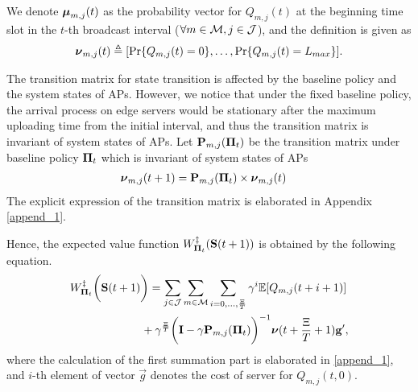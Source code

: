 \begin{lemma}
    We denote $\boldsymbol{\mu}_{m,j}(t)$ as the probability vector for $Q_{m,j}(t)$ at the beginning time slot in the $t$-th broadcast interval ($\forall m\in\mathcal{M}, j\in\mathcal{J}$), and the definition is given as
    \begin{align}
        \boldsymbol{\nu}_{m,j}(t) \triangleq [\Pr\{Q_{m,j}(t)=0\}, \dots, \Pr\{Q_{m,j}(t)=L_{max}\}].
    \end{align}

    The transition matrix for state transition is affected by the baseline policy and the system states of APs.
    However, we notice that under the fixed baseline policy, the arrival process on edge servers would be stationary after the maximum uploading time from the initial interval, and thus the transition matrix is invariant of system states of APs.
    Let $\mathbf{P}_{m,j}(\boldsymbol{\Pi}_{t})$ be the transition matrix under baseline policy $\boldsymbol{\Pi}_{t}$ which is invariant of system states of APs
    \begin{align}
        \boldsymbol{\nu}_{m,j}(t+1) &= \mathbf{P}_{m,j}(\boldsymbol{\Pi}_{t}) \times \boldsymbol{\nu}_{m,j}(t)
    \end{align}
    The explicit expression of the transition matrix is elaborated in Appendix \ref{append_1}.

    Hence, the expected value function $W^{\ddagger}_{\boldsymbol{\Pi}_{t}}(\mathbf{S}(t+1))$ is obtained by the following equation.
    {\small
    \begin{align}
        &W^{\ddagger}_{\boldsymbol{\Pi}_{t}}\bigg(\mathbf{S}(t+1)\bigg)
        = \sum_{j\in\mathcal{J}}\sum_{m\in\mathcal{M}}\sum_{i=0,\dots,\frac{\Xi}{T}} \gamma^{i} \mathbb{E}[ Q_{m,j}({t+i+1}) ]
        \nonumber\\
        &~~~~~~~~~~~~~~~~~~~+ \gamma^{\frac{\Xi}{T}} \bigg( \mathbf{I} - \gamma \mathbf{P}_{m,j}(\boldsymbol{\Pi}_{t}) \bigg)^{-1} \boldsymbol{\nu}({t+\frac{\Xi}{T}+1}) \mathbf{g}',
        \label{w_es}
    \end{align}   
    }
    where the calculation of the first summation part is elaborated in \ref{append_1}, and $i$-th element of vector $\vec{g}$ denotes the cost of server for $Q_{m,j}(t,0)$.
\end{lemma}

